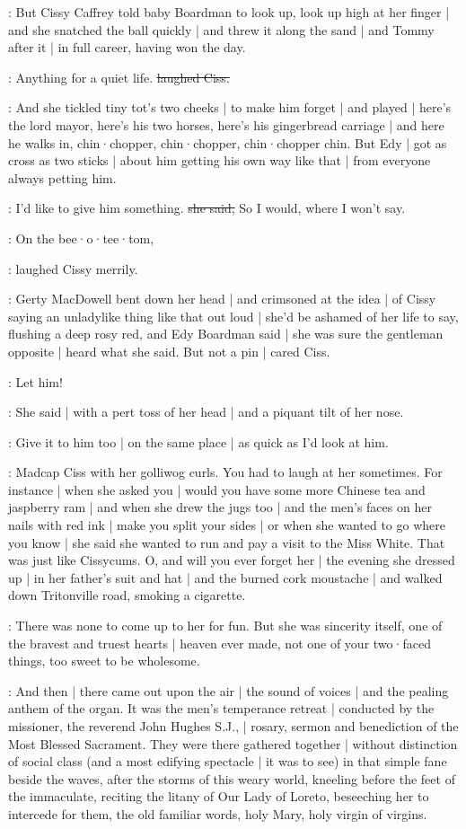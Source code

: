 :
But Cissy Caffrey told baby Boardman to look up,
look up high at her finger |
and she snatched the ball quickly |
and threw it along the sand |
and Tommy after it |
in full career,
having won the day.

\cissy:
Anything for a quiet life.
\sout{laughed Ciss.}

:
And she tickled tiny tot's two cheeks |
to make him forget |
and played |
here's the lord mayor,
here's his two horses,
here's his gingerbread carriage |
and here he walks in,
chin·chopper,
chin·chopper,
chin·chopper chin.
But Edy |
got as cross as two sticks |%
about him getting his own way like that |
from everyone always petting him.

\edy:
I'd like to give him something.
\sout{she said,}
So I would,
where I won't say.

\cissy:
On the bee·o·tee·tom,

:
laughed Cissy merrily.

\gertyReal:
Gerty MacDowell bent down her head |
and crimsoned at the idea |
of Cissy saying an unladylike thing like that out loud |
she'd be ashamed of her life to say,
flushing a deep rosy red,
and Edy Boardman said |
she was sure the gentleman opposite |
heard what she said.
But not a pin |
cared Ciss.

\cissy:
Let him!

:
She said |
with a pert toss of her head |
and a piquant tilt of her nose.

\cissy:
Give it to him too |
on the same place |
as quick as I'd look at him.

\gertyReal:
Madcap Ciss with her golliwog curls.%
You had to laugh at her sometimes.
For instance |
when she asked you |
would you have some more Chinese tea and jaspberry ram |
and when she drew the jugs too |
and the men's faces on her nails with red ink |
make you split your sides |
or when she wanted to go where you know |
she said she wanted to run and pay a visit to the Miss White.
That was just like Cissycums.
O,
and will you ever forget her |
the evening she dressed up |
in her father's suit and hat |
and the burned cork moustache |
and walked down Tritonville road,
smoking a cigarette.

\gertyNovel:
There was none to come up to her for fun.
But she was sincerity itself,
one of the bravest and truest hearts |
heaven ever made,
not one of your two·faced things,%
too sweet to be wholesome.

\Nrelig:
And then |
there came out upon the air |
the sound of voices |
and the pealing anthem of the organ.
It was the men's temperance retreat |
conducted by the missioner,
the reverend John Hughes S.J., |
rosary, sermon and benediction
of the Most Blessed Sacrament.
They were there gathered together |
without distinction of social class
(and a most edifying spectacle |
it was to see)
in that simple fane beside the waves,
after the storms
of this weary world,
kneeling before the feet of the immaculate,
reciting the litany of Our Lady of Loreto,
beseeching her to intercede for them,
the old familiar words,
holy Mary,
holy virgin of virgins.

